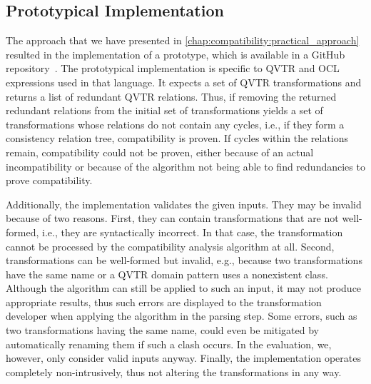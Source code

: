 \subsection{Prototypical Implementation}
\label{chap:correctness_evaluation:compatibility:implementation}

The approach that we have presented in \autoref{chap:compatibility:practical_approach} resulted in the implementation of a prototype, which is available in a GitHub repository~\cite{decompositionGithub}.
%
The prototypical implementation is specific to \gls{QVTR} and \gls{OCL} expressions used in that language.
It expects a set of \gls{QVTR} transformations and returns a list of redundant \gls{QVTR} relations.
Thus, if removing the returned redundant relations from the initial set of transformations yields a set of transformations whose relations do not contain any cycles, i.e., if they form a consistency relation tree, compatibility is proven.
If cycles within the relations remain, compatibility could not be proven, either because of an actual incompatibility or because of the algorithm not being able to find redundancies to prove compatibility.

Additionally, the implementation validates the given inputs.
They may be invalid because of two reasons.
First, they can contain transformations that are not well-formed, i.e., they are syntactically incorrect. In that case, the transformation cannot be processed by the compatibility analysis algorithm at all.
Second, transformations can be well-formed but invalid, e.g., because two transformations have the same name or a \gls{QVTR} domain pattern uses a nonexistent class.
Although the algorithm can still be applied to such an input, it may not produce appropriate results, thus such errors are displayed to the transformation developer when applying the algorithm in the parsing step.
Some errors, such as two transformations having the same name, could even be mitigated by automatically renaming them if such a clash occurs.
In the evaluation, we, however, only consider valid inputs anyway.
Finally, the implementation operates completely non-intrusively, thus not altering the transformations in any way.

